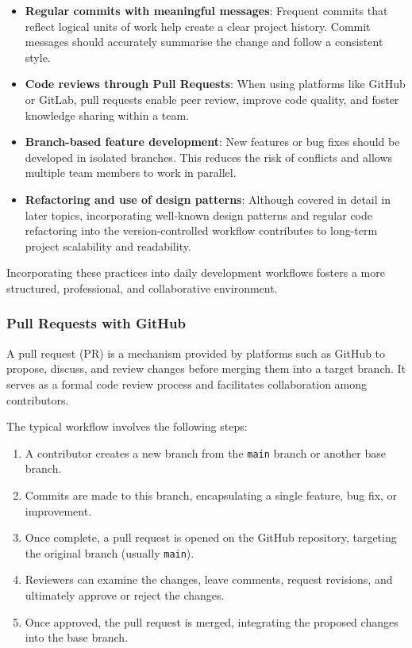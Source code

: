 \documentclass{article}
\begin{document}
\begin{itemize}
    \item \textbf{Regular commits with meaningful messages}: Frequent commits that reflect logical units of work help create a clear project history. Commit messages should accurately summarise the change and follow a consistent style.
    
    \item \textbf{Code reviews through Pull Requests}: When using platforms like GitHub or GitLab, pull requests enable peer review, improve code quality, and foster knowledge sharing within a team.
    
    \item \textbf{Branch-based feature development}: New features or bug fixes should be developed in isolated branches. This reduces the risk of conflicts and allows multiple team members to work in parallel.
    
    \item \textbf{Refactoring and use of design patterns}: Although covered in detail in later topics, incorporating well-known design patterns and regular code refactoring into the version-controlled workflow contributes to long-term project scalability and readability.
\end{itemize}

Incorporating these practices into daily development workflows fosters a more structured, professional, and collaborative environment.

\subsubsection{Pull Requests with GitHub}

A pull request (PR) is a mechanism provided by platforms such as GitHub to propose, discuss, and review changes before merging them into a target branch. It serves as a formal code review process and facilitates collaboration among contributors.

The typical workflow involves the following steps:

\begin{enumerate}
    \item A contributor creates a new branch from the \texttt{main} branch or another base branch.
    \item Commits are made to this branch, encapsulating a single feature, bug fix, or improvement.
    \item Once complete, a pull request is opened on the GitHub repository, targeting the original branch (usually \texttt{main}).
    \item Reviewers can examine the changes, leave comments, request revisions, and ultimately approve or reject the changes.
    \item Once approved, the pull request is merged, integrating the proposed changes into the base branch.
\end{enumerate}
\end{document}

